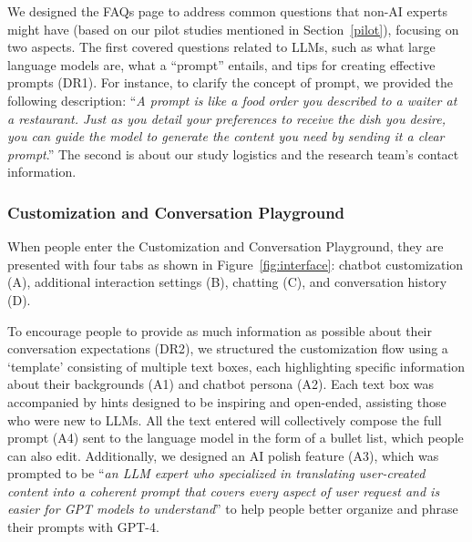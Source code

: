 We designed the FAQs page to address common questions that non-AI experts might have (based on our pilot studies mentioned in Section~\ref{pilot}), focusing on two aspects. The first covered questions related to LLMs, such as what large language models are, what a ``prompt'' entails, and tips for creating effective prompts (DR1). 
For instance, to clarify the concept of prompt, we provided the following description: ``\textit{A prompt is like a food order you described to a waiter at a restaurant. Just as you detail your preferences to receive the dish you desire, you can guide the model to generate the content you need by sending it a clear prompt}.'' 
The second is about our study logistics and the research team's contact information.

\subsubsection{Customization and Conversation Playground}

When people enter the Customization and Conversation Playground, they are presented with four tabs as shown in Figure~\ref{fig:interface}: 
chatbot customization (A), additional interaction settings (B), chatting (C), and conversation history (D).

To encourage people to provide as much information as possible about their conversation expectations (DR2), we structured the customization flow using a `template' consisting of multiple text boxes, each highlighting specific information about their backgrounds (A1) and chatbot persona (A2).
Each text box was accompanied by hints designed to be inspiring and open-ended, assisting those who were new to LLMs. All the text entered will collectively compose the full prompt (A4) sent to the language model in the form of a bullet list, which people can also edit. Additionally, we designed an AI polish feature (A3), which was prompted to be ``\textit{an LLM expert who specialized in translating user-created content into a coherent prompt that covers every aspect of user request and is easier for GPT models to understand}'' to help people better organize and phrase their prompts with GPT-4. 


